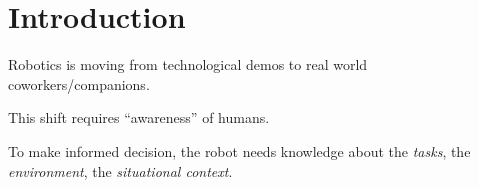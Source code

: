 \chapter{Introduction}
\label{chapter|introduction}

Robotics is moving from technological demos to real world coworkers/companions.

This shift requires ``awareness'' of humans.

To make informed decision, the robot needs knowledge about the \emph{tasks},
the \emph{environment}, the \emph{situational context}.
